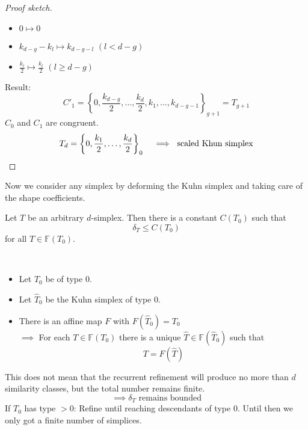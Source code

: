 \begin{proof}[Proof sketch]
\begin{enumerate}
			\begin{itemize}
				\item $0 \mapsto 0$
				\item $k_{d-g}-k_{l} \mapsto k_{d-g-l}$ $(l< d-g)$
				\item $\frac{k_{l}}{2}\mapsto \frac{k_{l}}{2}$ $(l \geq d-g)$
			\end{itemize}
	\end{enumerate}
	Result:
	\begin{equation*}
		C'_{1}= \left\{ 0, \frac{k_{d-g}}{2},\dots ,\frac{k_{d}}{2},k_{1},\dots ,k_{d-g-1} \right\}_{g+1} = T_{g+1}
	\end{equation*}
	$C_{0}$ and $C_{1}$ are congruent.
	\begin{equation*}
		T_{d}= \left\{ 0, \frac{k_{1}}{2},\dots ,\frac{k_{d}}{2} \right\}_{0} \quad \implies \text{ scaled Khun simplex} \qedhere
	\end{equation*}
\end{proof}
Now we consider any simplex by deforming the Kuhn simplex and taking care of the shape coefficients.
\begin{theorem}
	Let $T$ be an arbitrary $d$-simplex. Then there is a constant $C(T_{0})$ such that
	\begin{equation*}
		\delta_{T} \leq C(T_{0})
	\end{equation*}
	for all $T \in \mathbb{F}(T_{0})$.
\end{theorem}
\begin{proof_}\
	\begin{itemize}
		\item Let $T_{0}$ be of type $0$.
		\item Let $\hat{T}_{0}$ be the Kuhn simplex of type $0$.
		\item There is an affine map $F$ with $F(\hat{T}_{0})=T_{0}$ \\
			$\implies$ For each $T \in \mathbb{F}(T_{0})$ there is a unique $\hat{T} \in \mathbb{F}(\hat{T}_{0})$ such that
			\begin{equation*}
				T = F(\hat{T})
			\end{equation*}
			
	\end{itemize}
	This does not mean that the recurrent refinement will produce no more than $d$ similarity classes, but the total number remains finite.
	 \begin{equation*}
		 \implies \delta_{T} \text{ remains bounded}
	\end{equation*}
	If $T_{0}$ has type $>0$: Refine until reaching descendants of type $0$.
  Until then we only got a finite number of simplices.
\end{proof_}



